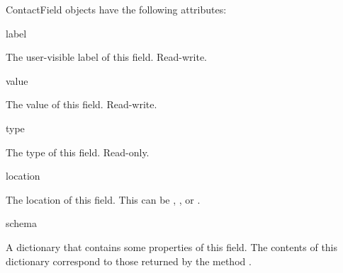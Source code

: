 \begin{classdesc*}{ContactField}
 objects have the following attributes:

\begin{memberdesc}[ContactField]{label}

The user-visible label of this field. Read-write.

\end{memberdesc}

\begin{memberdesc}[ContactField]{value}

The value of this field. Read-write.

\end{memberdesc}

\begin{memberdesc}[ContactField]{type}

The type of this field. Read-only.

\end{memberdesc}

\begin{memberdesc}[ContactField]{location}

The location of this field. This can be , , or 
.

\end{memberdesc}

\begin{memberdesc}[ContactField]{schema}

A dictionary that contains some properties of this field. The contents of this 
dictionary correspond to those returned by the  method 
.

\end{memberdesc}

\end{classdesc*}
